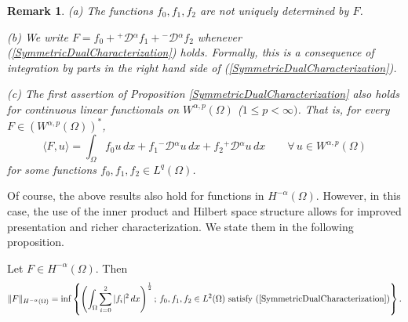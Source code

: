 \documentclass[leqno,final]{siamltex}
\numberwithin{equation}{section}
\newtheorem{remark}{Remark}[section]
\renewcommand{\(}{\bigl(}
\renewcommand{\)}{\bigr)}
\begin{document}
   \begin{remark}(a) The functions $f_0 , f_1 , f_2$ are not uniquely determined by $F$. 
   
   (b) We write $F = f_0 + {^{+}}{\mathcal{D}}{^{\alpha}} f_1 + {^{-}}{\mathcal{D}}{^{\alpha}} f_2$ whenever (\ref{SymmetricDualCharacterization}) holds. Formally, this is a consequence of integration by parts in the right hand side of (\ref{SymmetricDualCharacterization}).
   
   (c) The first assertion of Proposition \ref{SymmetricDualCharacterization} also holds for continuous linear functionals on $W^{\alpha ,p}(\Omega)$ ($1 \leq p < \infty)$. That is, for every $F \in (W^{\alpha,p}(\Omega))^{*}$, 
   \[
   \langle F , u \rangle  = \int_{\Omega} f_0 u \,dx + f_1 {^{-}}{\mathcal{D}}{^{\alpha}} u \, dx
    + f_2 {^{+}}{\mathcal{D}}{^{\alpha}} u\, dx \qquad \forall\, u \in W^{\alpha ,p}(\Omega)
    \]
    for some functions $f_0 , f_1 , f_2 \in L^{q}(\Omega)$. 
   \end{remark}
   
   Of course, the above results also hold for functions in $H^{-\alpha}(\Omega)$. However, 
   in this case, the use of the inner product and Hilbert space structure allows for improved presentation and richer characterization. We state them in the following proposition. 
   
   \begin{proposition}\label{SymmetricDualCharacterization1}
    Let $F \in H^{-\alpha}(\Omega)$. Then \begin{align}\label{DualNorm1}
        \|F\|_{H^{-\alpha}(\Omega)} = \inf \left\{ \left(\int_{\Omega} \sum_{i=0}^{2} |f_i|^{2} \,dx \right)^{\frac12};\, f_0 , f_1 , f_2 \in L^2(\Omega) \text{ satisfy } (\ref{SymmetricDualCharacterization}) \right\}.
    \end{align}
   \end{proposition}
   
\end{document}
